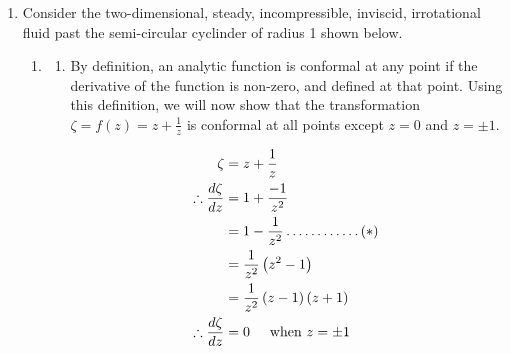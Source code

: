 \documentclass[a4paper]{article}
\begin{document}
\begin{enumerate}[label=\textbf{\arabic*.}]

	\item Consider the two-dimensional, steady, incompressible, inviscid, irrotational fluid past the semi-circular cyclinder of radius 1 shown below.

	\begin{center}
	\end{center}

	\begin{enumerate}

		\item 
		\begin{enumerate}

			\item By definition, an analytic function is conformal at any point if the derivative of the function is non-zero, and defined at that point. Using this definition, we will now show that the transformation $\displaystyle{\zeta = f(z) = z + \frac{1}{z}}$ is conformal at all points except $\displaystyle{z=0}$ and $\displaystyle{z=\pm 1}$.

			\begin{align*}
			\zeta & = z + \frac{1}{z}\\
			\therefore \frac{d\zeta}{dz} & = 1 + \frac{-1}{z^2}\\
			& = 1 - \frac{1}{z^2}\dots\dots\dots\dots(*)\\
			& = \frac{1}{z^2}\left(z^2-1\right)\\
			& = \frac{1}{z^2}\left(z-1\right)\left(z+1\right)\\
			\therefore \frac{d\zeta}{dz} & = 0 \hspace{5mm} \text{when $\displaystyle{z=\pm 1}$}\\
			\end{align*}


\end{enumerate}
\end{enumerate}
\end{enumerate}
\end{document}
